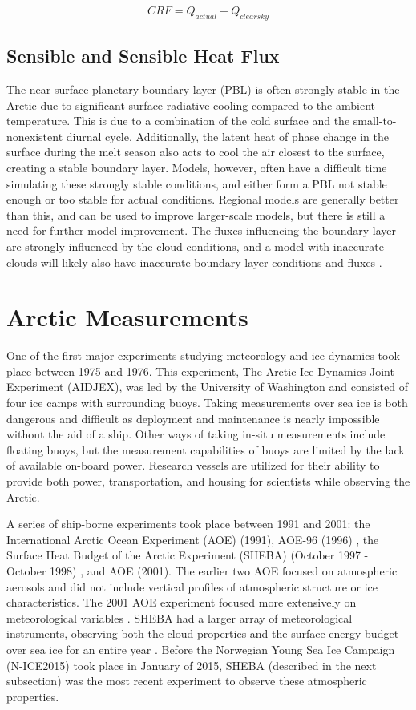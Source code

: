 \begin{equation}\label{ch1_eq_3}
CRF = Q_{actual} - Q_{clear sky}
\end{equation}

\subsection{Sensible and Sensible Heat Flux}

The near-surface planetary boundary layer (PBL) is often strongly stable in the Arctic due to significant surface radiative cooling compared to the ambient temperature. This is due to a combination of the cold surface and the small-to-nonexistent diurnal cycle. Additionally, the latent heat of phase change in the surface during the melt season also acts to cool the air closest to the surface, creating a stable boundary layer. Models, however, often have a difficult time simulating these strongly stable conditions, and either form a PBL not stable enough or too stable for actual conditions.  Regional models are generally better than this, and can be used to improve larger-scale models, but there is still a need for further model improvement. The fluxes influencing the boundary layer are strongly influenced by the cloud conditions, and a model with inaccurate clouds will likely also have inaccurate boundary layer conditions and fluxes \cite{tjernstrom:2005}. 

\section{Arctic Measurements}

One of the first major experiments studying meteorology and ice dynamics took place between 1975 and 1976. This experiment, The Arctic Ice Dynamics Joint Experiment (AIDJEX), was led by the University of Washington and consisted of four ice camps with surrounding buoys. Taking measurements over sea ice is both dangerous and difficult as deployment and maintenance is nearly impossible without the aid of a ship. Other ways of taking in-situ measurements include floating buoys, but the measurement capabilities of buoys are limited by the lack of available on-board power. Research vessels are utilized for their ability to provide both power, transportation, and housing for scientists while observing the Arctic.

A series of ship-borne experiments took place between 1991 and 2001: the International Arctic Ocean Experiment (AOE) (1991), AOE-96 (1996) \cite{tjernstrom:2004}, the Surface Heat Budget of the Arctic  Experiment (SHEBA) (October 1997 - October 1998) \cite{uttal:2002}, and AOE (2001). The earlier two AOE focused on atmospheric aerosols and did not include vertical profiles of atmospheric structure or ice characteristics.  The 2001 AOE experiment focused more extensively on meteorological variables \cite{tjernstrom:2004}. SHEBA had a larger array of meteorological instruments, observing both the cloud properties and the surface energy budget over sea ice for an entire year \cite{uttal:2002}. Before the Norwegian Young Sea Ice Campaign (N-ICE2015) took place in January of 2015, SHEBA (described in the next subsection) was the most recent experiment to observe these atmospheric properties. 

